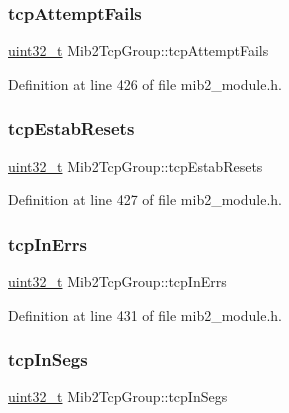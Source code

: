\subsubsection{\texorpdfstring{tcp\+Attempt\+Fails}{tcpAttemptFails}}
{\footnotesize\ttfamily \hyperlink{stdint_8h_a435d1572bf3f880d55459d9805097f62}{uint32\+\_\+t} Mib2\+Tcp\+Group\+::tcp\+Attempt\+Fails}



Definition at line 426 of file mib2\+\_\+module.\+h.

\mbox{\label{structMib2TcpGroup_a884ce616c038f8b0c4e619067cc0cb75}} 
\subsubsection{\texorpdfstring{tcp\+Estab\+Resets}{tcpEstabResets}}
{\footnotesize\ttfamily \hyperlink{stdint_8h_a435d1572bf3f880d55459d9805097f62}{uint32\+\_\+t} Mib2\+Tcp\+Group\+::tcp\+Estab\+Resets}



Definition at line 427 of file mib2\+\_\+module.\+h.

\mbox{\label{structMib2TcpGroup_a1183c385b2f410a98fe4fbca8aa3fd3a}} 
\subsubsection{\texorpdfstring{tcp\+In\+Errs}{tcpInErrs}}
{\footnotesize\ttfamily \hyperlink{stdint_8h_a435d1572bf3f880d55459d9805097f62}{uint32\+\_\+t} Mib2\+Tcp\+Group\+::tcp\+In\+Errs}



Definition at line 431 of file mib2\+\_\+module.\+h.

\mbox{\label{structMib2TcpGroup_a299e1f81b2aad58bdeac77bd88e21b38}} 
\subsubsection{\texorpdfstring{tcp\+In\+Segs}{tcpInSegs}}
{\footnotesize\ttfamily \hyperlink{stdint_8h_a435d1572bf3f880d55459d9805097f62}{uint32\+\_\+t} Mib2\+Tcp\+Group\+::tcp\+In\+Segs}




